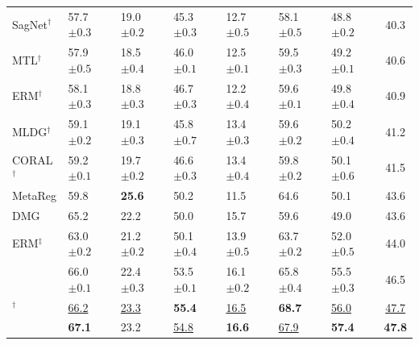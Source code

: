 \begin{table}[htbp]
\begin{tabular}{lllllll|c}
SagNet$^\dagger$ & 57.7 \scriptsize$\pm0.3$ & 19.0 \scriptsize$\pm0.2$ & 45.3 \scriptsize$\pm0.3$ & 12.7 \scriptsize$\pm0.5$ & 58.1 \scriptsize$\pm0.5$ & 48.8 \scriptsize$\pm0.2$ & 40.3 \\
MTL$^\dagger$ & 57.9 \scriptsize$\pm0.5$ & 18.5 \scriptsize$\pm0.4$ & 46.0 \scriptsize$\pm0.1$ & 12.5 \scriptsize$\pm0.1$ & 59.5 \scriptsize$\pm0.3$ & 49.2 \scriptsize$\pm0.1$ & 40.6 \\
ERM$^\dagger$ & 58.1 \scriptsize$\pm0.3$ & 18.8 \scriptsize$\pm0.3$ & 46.7 \scriptsize$\pm0.3$ & 12.2 \scriptsize$\pm0.4$ & 59.6 \scriptsize$\pm0.1$ & 49.8 \scriptsize$\pm0.4$ & 40.9 \\
MLDG$^\dagger$ & 59.1 \scriptsize$\pm0.2$ & 19.1 \scriptsize$\pm0.3$ & 45.8 \scriptsize$\pm0.7$ & 13.4 \scriptsize$\pm0.3$ & 59.6 \scriptsize$\pm0.2$ & 50.2 \scriptsize$\pm0.4$ & 41.2 \\
CORAL$^\dagger$ & 59.2 \scriptsize$\pm0.1$ & 19.7 \scriptsize$\pm0.2$ & 46.6 \scriptsize$\pm0.3$ & 13.4 \scriptsize$\pm0.4$ & 59.8 \scriptsize$\pm0.2$ & 50.1 \scriptsize$\pm0.6$ & 41.5 \\
MetaReg & 59.8 & \textbf{25.6} & 50.2 & 11.5 & 64.6 & 50.1 & 43.6 \\
DMG & 65.2 & 22.2 & 50.0 & 15.7 & 59.6 & 49.0 & 43.6 \\
ERM$^\ddagger$ & 63.0 \scriptsize$\pm0.2$ & 21.2 \scriptsize$\pm0.2$ & 50.1 \scriptsize$\pm0.4$ & 13.9 \scriptsize$\pm0.5$ & 63.7 \scriptsize$\pm0.2$ & 52.0 \scriptsize$\pm0.5$ & 44.0 \\
\swad{} & 66.0 \scriptsize$\pm0.1$ & 22.4 \scriptsize$\pm0.3$ & 53.5 \scriptsize$\pm0.1$ & 16.1 \scriptsize$\pm0.2$ & 65.8 \scriptsize$\pm0.4$ & 55.5 \scriptsize$\pm0.3$ & 46.5 \\
\diwa{}$^\dagger$ & \underline{66.2} & \underline{23.3} & \textbf{55.4} & \underline{16.5} & \textbf{68.7} & \underline{56.0} & \underline{47.7} \\
\midrule
\cda{} & \textbf{67.1} & 23.2 & \underline{54.8} & \textbf{16.6} & \underline{67.9} & \textbf{57.4} & \textbf{47.8} \\
\bottomrule
\end{tabular}
\end{table}
